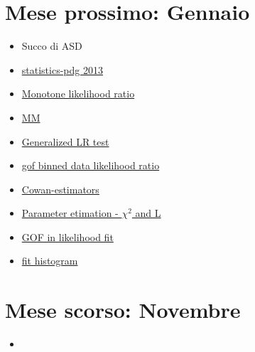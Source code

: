 \documentclass[main.tex]{subfiles}
\begin{document}
\chapter{Mese prossimo: Gennaio}


\begin{itemize}
\item Succo di ASD
\item \href{http://pdg.lbl.gov/2013/reviews/rpp2013-rev-statistics.pdf}{statistics-pdg 2013}
\item \href{https://en.m.wikipedia.org/wiki/Monotone_likelihood_ratio}{Monotone likelihood ratio}
\item \href{https://pdfs.semanticscholar.org/b030/c65f8bd32e141ef1a28f7e289921786fadcf.pdf}{MM}
\item \href{https://web.stanford.edu/class/archive/stats/stats200/stats200.1172/Lecture22.pdf}{Generalized LR test}
\item \href{https://www.google.com/search?q=gof%20binned%20data%20likelihood%20ratio&ie=utf-8&oe=utf-8&client=firefox-b-m#sbfbu=1&pi=gof%20binned%20data%20likelihood%20ratio}{gof binned data likelihood ratio}
\item \href{https://agenda.infn.it/event/16360/contributions/33703/attachments/63753/76855/cowan_paestum_2019.pdf}{Cowan-estimators}
\item \href{https://www.physik.hu-berlin.de/de/gk1504/block-courses/autumn-2010/program_and_talks/Verkerke_part3}{Parameter etimation - $\chi^2$ and L}
\item \href{https://arxiv.org/pdf/physics/0509008.pdf}{GOF in likelihood fit}
\item \href{https://physique.cuso.ch/fileadmin/physique/document/jameschap7.pdf}{fit histogram}
\end{itemize}

\chapter{Mese scorso: Novembre}

\begin{itemize}
\item 
\end{itemize}
\end{document}

